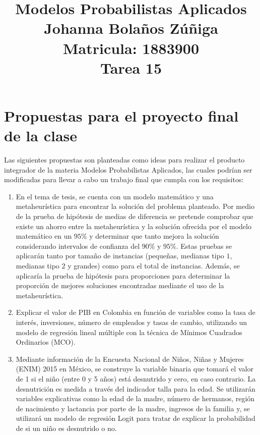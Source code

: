 \documentclass{article}
\title{
\centering
Modelos Probabilistas Aplicados \\
Johanna Bolaños Zúñiga \\
Matricula: 1883900\\
Tarea 15
}
\date{}
\begin{document}
\maketitle

\section{Propuestas para el proyecto final de la clase}

Las siguientes propuestas son planteadas como ideas para realizar el producto integrador de la materia Modelos Probabilistas Aplicados, las cuales podrían ser modificadas para llevar a cabo un trabajo final que cumpla con los requisitos:

\begin{enumerate}
    \item En el tema de tesis, se cuenta con un modelo matemático y una metaheurística para encontrar la solución del problema planteado. Por medio de la prueba de hipótesis de medias de diferencia se pretende comprobar que existe un ahorro entre la metaheurística y la solución ofrecida por el modelo matemático en un $95\%$ y determinar que tanto mejora la solución considerando intervalos de confianza del $90\%$ y $95\%$. Estas pruebas se aplicarán tanto por tamaño de instancias (pequeñas, medianas tipo $1$, medianas tipo $2$ y grandes) como para el total de instancias. Además, se aplicaría la prueba de hipótesis para proporciones para determinar la proporción de mejores soluciones encontradas mediante el uso de la metaheurística.
    \item Explicar el valor de PIB en Colombia en función de variables como la tasa de interés, inversiones, número de empleados y tasas de cambio, utilizando un modelo de regresión lineal múltiple con la técnica de Mínimos Cuadrados Ordinarios (MCO).
    \item Mediante información de la Encuesta Nacional de Niños, Niñas y Mujeres (ENIM) 2015 en México, se construye la variable binaria que tomará el valor de 1 si el niño (entre 0 y 5 años) está desnutrido y cero, en caso contrario. La desnutrición es medida a través del indicador talla para la edad. Se utilizarán variables explicativas como la edad de la madre, número de hermanos, región de nacimiento y lactancia por parte de la madre, ingresos de la familia y, se utilizará un modelo de regresión Logit para tratar de explicar la probabilidad de si un niño es desnutrido o no.
\end{enumerate}


%
%
\end{document}
